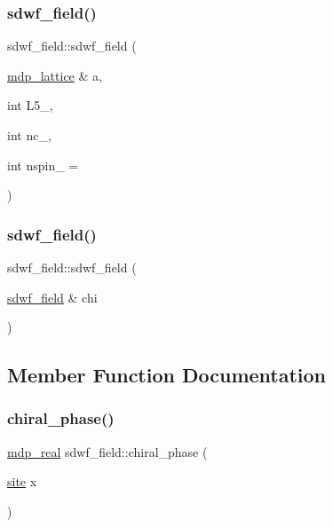 \subsubsection{\texorpdfstring{sdwf\+\_\+field()}{sdwf\_field()}\hspace{0.1cm}{\footnotesize\ttfamily [1/2]}}
{\footnotesize\ttfamily sdwf\+\_\+field\+::sdwf\+\_\+field (\begin{DoxyParamCaption}\item[{\hyperlink{classmdp__lattice}{mdp\+\_\+lattice} \&}]{a,  }\item[{int}]{L5\+\_\+,  }\item[{int}]{nc\+\_\+,  }\item[{int}]{nspin\+\_\+ = {} }\end{DoxyParamCaption})\hspace{0.3cm}{\ttfamily [inline]}}

\mbox{\label{classsdwf__field_af1438250ba08d632c4906ef99ad907ea}} 
\subsubsection{\texorpdfstring{sdwf\+\_\+field()}{sdwf\_field()}\hspace{0.1cm}{\footnotesize\ttfamily [2/2]}}
{\footnotesize\ttfamily sdwf\+\_\+field\+::sdwf\+\_\+field (\begin{DoxyParamCaption}\item[{\hyperlink{classsdwf__field}{sdwf\+\_\+field} \&}]{chi }\end{DoxyParamCaption})\hspace{0.3cm}{\ttfamily [inline]}}



\subsection{Member Function Documentation}
\mbox{\label{classsdwf__field_a29fce204e377b7a190455e4faf0a2a0c}} 
\subsubsection{\texorpdfstring{chiral\+\_\+phase()}{chiral\_phase()}}
{\footnotesize\ttfamily \hyperlink{mdp__global__vars_8h_a69d96b74c791e0bbdb888b3913a69450}{mdp\+\_\+real} sdwf\+\_\+field\+::chiral\+\_\+phase (\begin{DoxyParamCaption}\item[{\hyperlink{mdp__compatibility__macros_8h_aa6f1179c424e48adef1cedf7c436eb75}{site}}]{x }\end{DoxyParamCaption})\hspace{0.3cm}{\ttfamily [inline]}}

